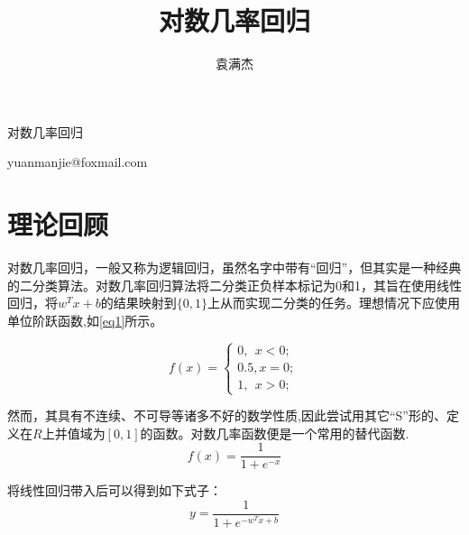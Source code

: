 \documentclass{SCIS2020cn}
\begin{document}
\DOI{}
\ReceiveDate{}
\ReviseDate{}
\AcceptDate{}
\OnlineDate{}

\title{对数几率回归}{对数几率回归}


\author[1]{袁满杰}{{yuanmanjie@foxmail.com}}


\address[1]{南京大学, 南京 210023}







\maketitle

\section{理论回顾}

对数几率回归，一般又称为逻辑回归，虽然名字中带有“回归”，但其实是一种经典的二分类算法。对数几率回归算法将二分类正负样本标记为0和1，其旨在使用线性回归，将$w^Tx+b$的结果映射到$\{0,1\}$上从而实现二分类的任务。理想情况下应使用单位阶跃函数,如\ref{eq1}所示。

\begin{equation}
    \label{eq1}
    f(x)=\begin{cases}
        0,\ \ x<0;\\
        0.5, x=0;\\
        1,\ \ x>0;
    \end{cases}
\end{equation}

然而，其具有不连续、不可导等诸多不好的数学性质,因此尝试用其它“S”形的、定义在$R$上并值域为$[0,1]$的函数。对数几率函数便是一个常用的替代函数.
\begin{equation}
    f(x)=\frac{1}{1+e^{-x}}
\end{equation}

将线性回归带入后可以得到如下式子：
\begin{equation}
    y=\frac{1}{1+e^{-w^Tx+b}}
\end{equation}
\end{document}
